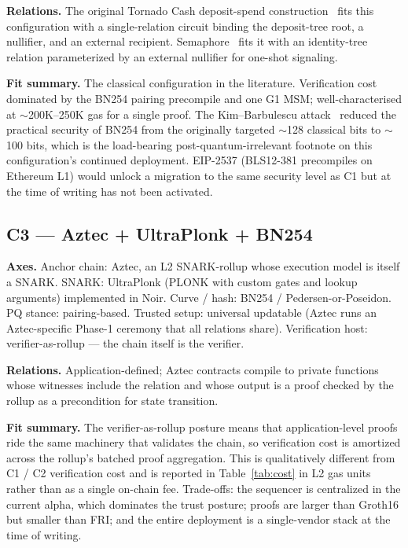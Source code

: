 \textbf{Relations.} The original Tornado Cash deposit-spend
construction~\cite{pertsev-2019-tornado} fits this configuration with
a single-relation circuit binding the deposit-tree root, a nullifier,
and an external recipient. Semaphore~\cite{semaphore-2024} fits it
with an identity-tree relation parameterized by an external nullifier
for one-shot signaling.

\textbf{Fit summary.} The classical configuration in the literature.
Verification cost dominated by the BN254 pairing precompile and one
G1 MSM; well-characterised at $\sim$200K--250K gas for a single
proof. The
Kim--Barbulescu attack~\cite{kim-barbulescu-2016} reduced the
practical security of BN254 from the originally targeted $\sim$128
classical bits to $\sim$100 bits, which is the load-bearing
post-quantum-irrelevant footnote on this configuration's continued
deployment. EIP-2537 (BLS12-381 precompiles on Ethereum L1) would
unlock a migration to the same security level as C1 but at the time
of writing has not been activated.

\subsection{C3 --- Aztec + UltraPlonk + BN254}
\label{sec:cfg-c3}

\textbf{Axes.} Anchor chain: Aztec, an L2 SNARK-rollup whose
execution model is itself a SNARK. SNARK: UltraPlonk (PLONK with
custom gates and lookup arguments) implemented in Noir. Curve / hash:
BN254 / Pedersen-or-Poseidon. PQ stance: pairing-based. Trusted
setup: universal updatable (Aztec runs an Aztec-specific Phase-1
ceremony that all relations share). Verification host:
verifier-as-rollup --- the chain itself is the verifier.

\textbf{Relations.} Application-defined; Aztec contracts compile to
private functions whose witnesses include the relation and whose
output is a proof checked by the rollup as a precondition for state
transition.

\textbf{Fit summary.} The verifier-as-rollup posture means that
application-level proofs ride the same machinery that validates the
chain, so verification cost is amortized across the rollup's batched
proof aggregation. This is qualitatively different from C1 / C2
verification cost and is reported in
Table~\ref{tab:cost} in L2 gas units rather than as a single
on-chain fee. Trade-offs: the sequencer is centralized in the
current alpha, which dominates the trust posture; proofs are larger
than Groth16 but smaller than FRI; and the entire deployment is a
single-vendor stack at the time of writing.

